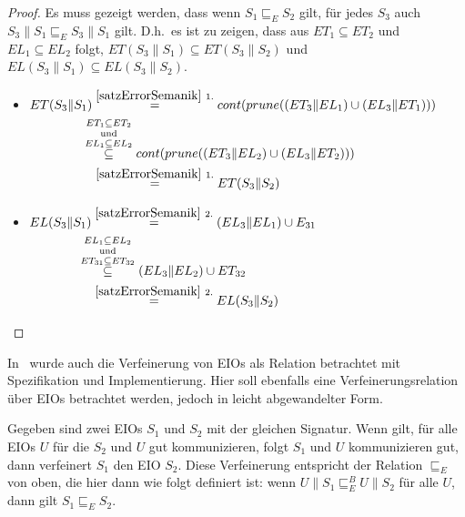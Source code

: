 \begin{proof}
  Es muss gezeigt werden, dass wenn $S_1\sqsubseteq _E S_2$ gilt, für jedes
  $S_3$ auch
  $S_3\|S_1\sqsubseteq _E S_3\|S_1$ gilt. D.h.\ es ist zu zeigen, dass aus
  $ET_1\subseteq ET_2$ und $EL_1\subseteq EL_2$ folgt, $ET(S_3\|S_1)\subseteq
  ET(S_3\|S_2)$ und $EL(S_3\|S_1)\subseteq EL(S_3\|S_2)$.\\
  \begin{itemize}
    \item $\begin{aligned}[t]
        ET(S_3\|S_1) &\overset{\ref{satzErrorSemanik}~1.}{=}
      cont(prune((ET_3\|EL_1)\cup (EL_3\|ET_1)))\\
      &\hspace{-0.3cm}\overset{ET_1\subseteq
    ET_2}{\overset{\mathrm{und}}{\overset{EL_1\subseteq EL_2}{\subseteq}}}
    cont(prune((ET_3\|EL_2)\cup (EL_3\|ET_2)))\\
      &\overset{\ref{satzErrorSemanik}~1.}{=} ET(S_3\|S_2)
    \end{aligned}$
    \item $\begin{aligned}[t]
        EL(S_3\|S_1) &\overset{\ref{satzErrorSemanik}~2.}{=} (EL_3\|EL_1)\cup
        E_{31}\\
        &\hspace{-0.4cm}\overset{EL_1\subseteq
      EL_2}{\overset{\mathrm{und}}{\overset{ET_{31}\subseteq
      ET_{32}}{\subseteq}}} (EL_3\|EL_2)\cup ET_{32}\\
      &\overset{\ref{satzErrorSemanik}~2.}{=} EL(S_3\|S_2)
    \end{aligned}$
  \end{itemize}
\end{proof}

In~\cite{Vogler2014EIO} wurde auch die Verfeinerung von EIOs als Relation betrachtet
mit Spezifikation und Implementierung. Hier soll ebenfalls eine
Verfeinerungsrelation über EIOs betrachtet werden, jedoch in leicht
abgewandelter Form.

\begin{lem}
  \label{lemVerfeinerung}
  Gegeben sind zwei EIOs $S_1$ und $S_2$ mit der gleichen Signatur. Wenn gilt,
  für alle EIOs $U$ für die $S_2$ und $U$ gut kommunizieren, folgt $S_1$
  und $U$ kommunizieren gut, dann verfeinert $S_1$ den EIO $S_2$. Diese Verfeinerung
  entspricht der Relation $\sqsubseteq _E$ von oben, die hier dann wie folgt
  definiert ist: wenn $U\|S_1 \sqsubseteq _E^B U\|S_2$ für alle $U$, dann gilt
  $S_1\sqsubseteq _E S_2$.
\end{lem}

